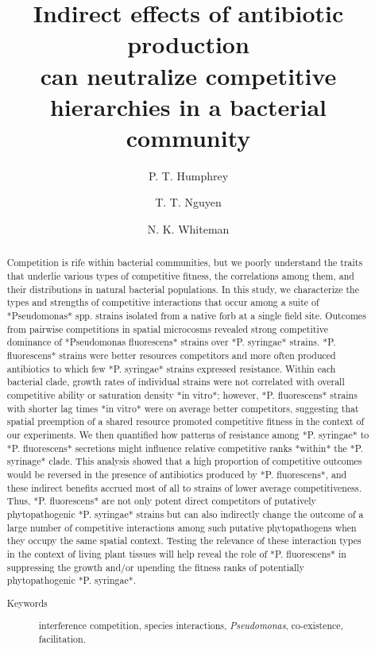 \documentclass[%
preprint,
superscriptaddress,
 amsmath,amssymb,
 aps,
]{revtex4-1}
\begin{document}
\title{Indirect effects of antibiotic production\\can neutralize competitive hierarchies in a bacterial community}
\author{P. T. Humphrey}
\author{T. T. Nguyen}
\author{N. K. Whiteman}


\begin{abstract}

Competition is rife within bacterial communities, but we poorly understand the traits that underlie various types of competitive fitness, the correlations among them, and their distributions in natural bacterial populations. In this study, we characterize the types and strengths of competitive interactions that occur among a suite of *Pseudomonas* spp. strains isolated from a native forb at a single field site. Outcomes from pairwise competitions in spatial microcosms revealed strong competitive dominance of *Pseudomonas fluorescens* strains over *P. syringae* strains. *P. fluorescens* strains were better resources competitors and more often produced antibiotics to which few *P. syringae* strains expressed resistance. Within each bacterial clade, growth rates of individual strains were not correlated with overall competitive ability or saturation density *in vitro*; however, *P. fluorescens* strains with shorter lag times *in vitro* were on average better competitors, suggesting that spatial preemption of a shared resource promoted competitive fitness in the context of our experiments. We then quantified how patterns of resistance among *P. syringae* to *P. fluorescens* secretions might influence relative competitive ranks *within* the *P. syrinage* clade. This analysis showed that a high proportion of competitive outcomes would be reversed in the presence of antibiotics produced by *P. fluorescens*, and these indirect benefits accrued most of all to strains of lower average competitiveness. Thus, *P. fluorescens* are not only potent direct competitors of putatively phytopathogenic *P. syringae* strains but can also indirectly change the outcome of a large number of competitive interactions among such putative phytopathogens when they occupy the same spatial context. Testing the relevance of these interaction types in the context of living plant tissues will help reveal the role of *P. fluorescens* in suppressing the growth and/or upending the fitness ranks of potentially phytopathogenic *P. syringae*.

\begin{description}
\item[Keywords] interference competition, species interactions, \emph{Pseudomonas}, co-existence, facilitation.
\end{description}
\end{abstract}
\end{document}
